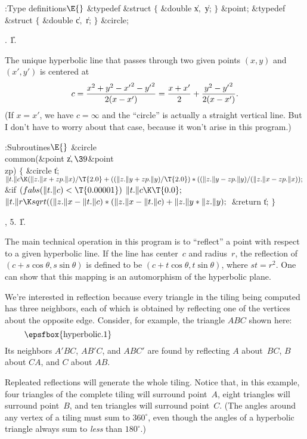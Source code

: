 \Y\B\4:Type definitions\X${}\E{}$\6
\&{typedef} \&{struct} ${}\{{}$\5
\1\&{double} \|x${},{}$ \|y;\5
\2${}\}{}$\5
\&{point};\6
\&{typedef} \&{struct} ${}\{{}$\5
\1\&{double} \|c${},{}$ \|r;\5
\2${}\}{}$\5
\&{circle};\par
{}.
\U1.\fi

The unique hyperbolic line that passes through two given points
$(x,y)$ and $(x',y')$ is centered at
$$c={x^2+y^2-{x'}^2-{y'}^2\over 2(x-x')}
={x+x'\over2}+{y^2-{y'}^2\over2(x-x')}.$$
(If $x=x'$, we have $c=\infty$ and the ``circle'' is actually a
straight vertical line. But I don't have to worry about that case,
because it won't arise in this program.)

\Y\B\4:Subroutines\X${}\E{}$\6
\&{circle} \\{common}(\&{point} \|z${},\39{}$\&{point} \\{zp})\1\1\2\2\6
${}\{{}$\1\6
\&{circle} \|t;\7
${}\|t.\|c\K(\|z.\|x+\\{zp}.\|x)/\T{2.0}+((\|z.\|y+\\{zp}.\|y)/\T{2.0})*((\|z.%
\|y-\\{zp}.\|y)/(\|z.\|x-\\{zp}.\|x));{}$\6
\&{if} ${}(\\{fabs}(\|t.\|c)<\T{0.00001}){}$\1\5
${}\|t.\|c\K\T{0.0};{}$\2\6
${}\|t.\|r\K\\{sqrt}((\|z.\|x-\|t.\|c)*(\|z.\|x-\|t.\|c)+\|z.\|y*\|z.\|y);{}$\6
\&{return} \|t;\6
\4${}\}{}$\2\par
{}, 5.
\U1.\fi

The main technical operation in this program is to
``reflect'' a point with respect to a given hyperbolic line.
If the line has center~$c$ and radius~$r$, the reflection
of $(c+s\cos\theta,s\sin\theta)$ is defined to be
$(c+t\cos\theta,t\sin\theta)$, where $st=r^2$. One can show
that this mapping is an automorphism of the hyperbolic plane.

We're interested in reflection because every triangle in the
tiling being computed has three neighbors, each of which is
obtained by reflecting one of the vertices about the
opposite edge. Consider, for example, the triangle $ABC$
shown here:
$$\vcenter{\epsfbox{hyperbolic.1}}$$
Its neighbors $A'BC$, $AB'C$, and $ABC'$ are found by
reflecting $A$ about~$BC$, $B$ about $C\!A$, and $C$ about $AB$.

Repleated reflections will generate the whole tiling. Notice that,
in this example, four triangles of the complete tiling will surround
point~$A$, eight triangles will surround point~$B$, and
ten triangles will surround point~$C$. (The angles around any vertex
of a tiling must sum to $360^\circ$, even though the
angles of a hyperbolic triangle always sum to {\it less\/} than
$180^\circ$.)

